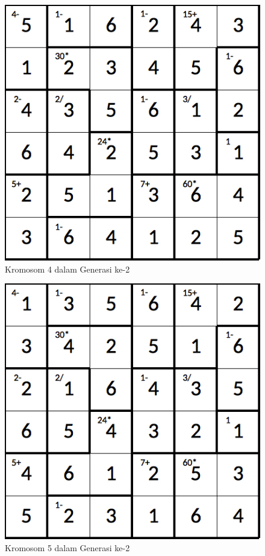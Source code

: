 \documentclass[a4paper,twoside]{article}
\begin{document}
\begin{enumerate}
\begin{figure}
\centering
\captionsetup{justification=centering}
\includegraphics[scale=0.333]{Gambar/hybridgenetic/Generation2Chromosome4}
\caption[Kromosom 4 dalam Generasi ke-2]{Kromosom 4 dalam Generasi ke-2}
\label{fig:analisisg2k4}
\end{figure}

\begin{figure}
\centering
\captionsetup{justification=centering}
\includegraphics[scale=0.333]{Gambar/hybridgenetic/Generation2Chromosome5}
\caption[Kromosom 5 dalam Generasi ke-2]{Kromosom 5 dalam Generasi ke-2}
\label{fig:analisisg2k5}
\end{figure}


\end{enumerate}
\end{document}
